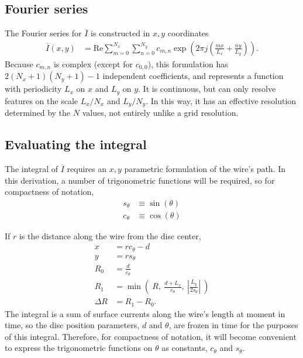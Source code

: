 \documentclass{article}
\def\I{\overline{I}}
\def\real{\mathrm{Re}}
\begin{document}
\subsection{Fourier series}

The Fourier series for $\I$ is constructed in $x,y$ coordinates
\begin{align}
\I(x,y) &= \real \sum_{m=0}^{N_x} \sum_{n=0}^{N_y} c_{m,n} \exp\left(2\pi j \left(\frac{mx}{L_x} + \frac{ny}{L_y}\right)\right).
\end{align}
Because $c_{m,n}$ is complex (except for $c_{0,0}$), this formulation has $2(N_x+1)(N_y+1)-1$ independent coefficients, and represents a function with periodicity $L_x$ on $x$ and $L_y$ on $y$.  It is continuous, but can only resolve features on the scale $L_x / N_x$ and $L_y / N_y$.  In this way, it has an effective resolution determined by the $N$ values, not entirely unlike a grid resolution.

\subsection{Evaluating the integral}

The integral of $\I$ requires an $x,y$ parametric formulation of the wire's path.  In this derivation, a number of trigonometric functions will be required, so for compactness of notation, 
\begin{align}
s_\theta &\equiv \sin(\theta)\\
c_\theta &\equiv \cos(\theta)
\end{align}

If $r$ is the distance along the wire from the disc center,
\begin{align}
x &= r c_\theta - d\\
y &= r s_\theta\\
R_0 &= \frac{d}{c_\theta}\\
R_1 &= \min\left(\ R,\ \frac{d + L_x}{c_\theta},\ \left|\frac{L_y}{2s_\theta}\right|\ \right)\\
\Delta R &= R_1 - R_0.
\end{align}
The integral is a sum of surface currents along the wire's length at moment in time, so the disc position parameters, $d$ and $\theta$, are frozen in time for the purposes of this integral.  Therefore, for compactness of notation, it will become convenient to express the trigonometric functions on $\theta$ as constants, $c_\theta$ and $s_\theta$.
\end{document}

